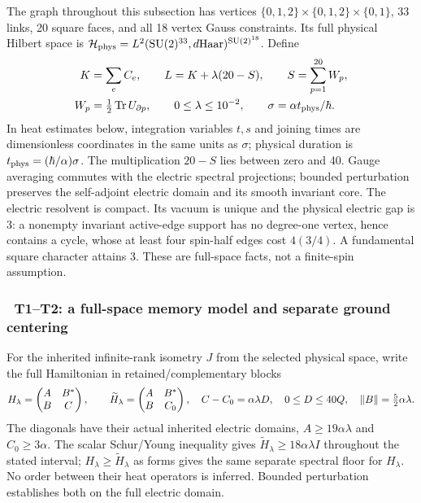 The graph throughout this subsection has vertices
$\{0,1,2\}\times\{0,1,2\}\times\{0,1\}$, 33 links, 20 square faces, and all
18 vertex Gauss constraints.  Its full physical Hilbert space is
$\mathcal H_{\rm phys}=L^2(\mathrm{SU}(2)^{33},d\mathrm{Haar})^{\mathrm{SU}(2)^{18}}$.
Define
\begin{equation}
 \begin{aligned}
 K&=\sum_e C_e,\qquad L=K+\lambda(20-S),\qquad
 S=\sum_{p=1}^{20}W_p,\\
 W_p&=\tfrac12\operatorname{Tr} U_{\partial p},\qquad
 0\le\lambda\le10^{-2},\qquad\sigma=\alpha t_{\rm phys}/\hbar.
 \end{aligned}
 \label{recent:graph-model}
\end{equation}
In heat estimates below, integration variables $t,s$ and joining times are dimensionless coordinates in the same units as $\sigma$; physical duration is $t_{\rm phys}=(\hbar/\alpha)\sigma$.
The multiplication $20-S$ lies between zero and 40.  Gauge averaging commutes
with the electric spectral projections; bounded perturbation preserves the
self-adjoint electric domain and its smooth invariant core.  The electric
resolvent is compact.  Its vacuum is unique and the physical electric gap is
3: a nonempty invariant active-edge support has no degree-one vertex, hence
contains a cycle, whose at least four spin-half edges cost $4(3/4)$.
A fundamental square character attains 3.  These are full-space facts, not a
finite-spin assumption.

\subsubsection{\workstar\ T1--T2: a full-space memory model and separate ground centering}

For the inherited infinite-rank isometry $J$ from the selected physical space,
write the full Hamiltonian in retained/complementary blocks
\begin{equation}
 H_\lambda=\begin{pmatrix}A&B^*\\B&C\end{pmatrix},\qquad
 \widetilde H_\lambda=\begin{pmatrix}A&B^*\\B&C_0\end{pmatrix},\quad
 C-C_0=\alpha\lambda D,\quad 0\le D\le40Q,
 \quad\left\lVert B\right\rVert=\tfrac52\alpha\lambda.
 \label{recent:t-blocks}
\end{equation}
The diagonals have their actual inherited electric domains,
$A\ge19\alpha\lambda$ and $C_0\ge3\alpha$.
The scalar Schur/Young inequality gives
$\widetilde H_\lambda\ge18\alpha\lambda I$ throughout the stated interval;
$H_\lambda\ge\widetilde H_\lambda$ as forms gives the same separate spectral
floor for $H_\lambda$.  No order between their heat operators is inferred.
Bounded perturbation establishes both on the full electric domain.

